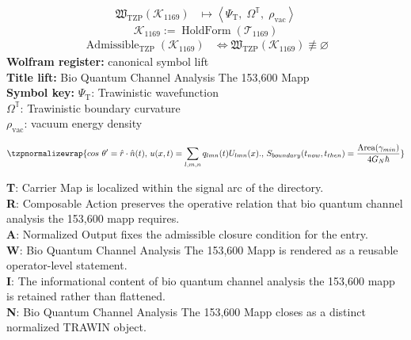 \noindent
\begin{minipage}[t]{0.48\linewidth}
\begingroup
\small
\[
\begin{aligned}
\mathfrak{W}_{\mathrm{TZP}}\!\left(\mathcal{K}_{1169}\right)
&\longmapsto
\left\langle \Psi_{\mathrm{T}},\; \Omega^{\mathbb{T}},\; \rho_{\mathrm{vac}} \right\rangle
\end{aligned}
\]
\[
\mathcal{K}_{1169}
:=
\operatorname{HoldForm}\!\left(\mathcal{T}_{1169}\right)
\]
\[
\begin{aligned}
\operatorname{Admissible}_{\mathrm{TZP}}\!\left(\mathcal{K}_{1169}\right)
&\Longleftrightarrow
\mathfrak{W}_{\mathrm{TZP}}\!\left(\mathcal{K}_{1169}\right)\not\equiv\varnothing
\end{aligned}
\]
\textbf{Wolfram register:} canonical symbol lift\\
\textbf{Title lift:} Bio Quantum Channel Analysis The 153,600 Mapp\\
\textbf{Symbol key:} \(\Psi_{\mathrm{T}}\): Trawinistic wavefunction\\ \(\Omega^{\mathbb{T}}\): Trawinistic boundary curvature\\ \(\rho_{\mathrm{vac}}\): vacuum energy density
\par
\endgroup
\end{minipage}\hfill
\begin{minipage}[t]{0.48\linewidth}
\[
\tzpnormalizewrap{cos~\theta^{\prime}=\hat{r}\cdot\hat{n}(t),\,u(x,t)=\sum_{l,m,n}q_{lmn}(t)U_{lmn}(x).,\,S_{boundary}(t_{now}, t_{then}) = \frac{\text{Area}(\gamma_{min})}{4 G_N \hbar}}
\]

\small
\textbf{T}: Carrier Map is localized within the signal arc of the directory.\\
\textbf{R}: Composable Action preserves the operative relation that bio quantum channel analysis the 153,600 mapp requires.\\
\textbf{A}: Normalized Output fixes the admissible closure condition for the entry.\\
\textbf{W}: Bio Quantum Channel Analysis The 153,600 Mapp is rendered as a reusable operator-level statement.\\
\textbf{I}: The informational content of bio quantum channel analysis the 153,600 mapp is retained rather than flattened.\\
\textbf{N}: Bio Quantum Channel Analysis The 153,600 Mapp closes as a distinct normalized TRAWIN object.
\normalsize
\end{minipage}

